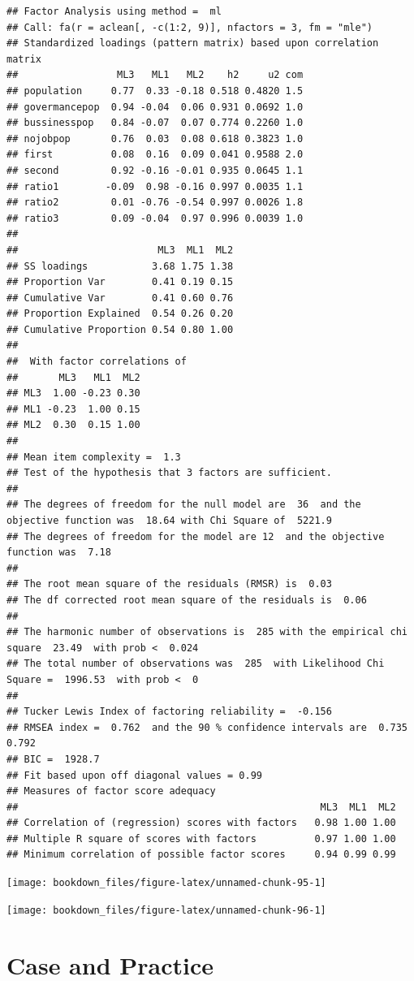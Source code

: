 \documentclass[]{ctexbook}
\begin{document}
\begin{verbatim}
## Factor Analysis using method =  ml
## Call: fa(r = aclean[, -c(1:2, 9)], nfactors = 3, fm = "mle")
## Standardized loadings (pattern matrix) based upon correlation matrix
##                 ML3   ML1   ML2    h2     u2 com
## population     0.77  0.33 -0.18 0.518 0.4820 1.5
## govermancepop  0.94 -0.04  0.06 0.931 0.0692 1.0
## bussinesspop   0.84 -0.07  0.07 0.774 0.2260 1.0
## nojobpop       0.76  0.03  0.08 0.618 0.3823 1.0
## first          0.08  0.16  0.09 0.041 0.9588 2.0
## second         0.92 -0.16 -0.01 0.935 0.0645 1.1
## ratio1        -0.09  0.98 -0.16 0.997 0.0035 1.1
## ratio2         0.01 -0.76 -0.54 0.997 0.0026 1.8
## ratio3         0.09 -0.04  0.97 0.996 0.0039 1.0
## 
##                        ML3  ML1  ML2
## SS loadings           3.68 1.75 1.38
## Proportion Var        0.41 0.19 0.15
## Cumulative Var        0.41 0.60 0.76
## Proportion Explained  0.54 0.26 0.20
## Cumulative Proportion 0.54 0.80 1.00
## 
##  With factor correlations of 
##       ML3   ML1  ML2
## ML3  1.00 -0.23 0.30
## ML1 -0.23  1.00 0.15
## ML2  0.30  0.15 1.00
## 
## Mean item complexity =  1.3
## Test of the hypothesis that 3 factors are sufficient.
## 
## The degrees of freedom for the null model are  36  and the objective function was  18.64 with Chi Square of  5221.9
## The degrees of freedom for the model are 12  and the objective function was  7.18 
## 
## The root mean square of the residuals (RMSR) is  0.03 
## The df corrected root mean square of the residuals is  0.06 
## 
## The harmonic number of observations is  285 with the empirical chi square  23.49  with prob <  0.024 
## The total number of observations was  285  with Likelihood Chi Square =  1996.53  with prob <  0 
## 
## Tucker Lewis Index of factoring reliability =  -0.156
## RMSEA index =  0.762  and the 90 % confidence intervals are  0.735 0.792
## BIC =  1928.7
## Fit based upon off diagonal values = 0.99
## Measures of factor score adequacy             
##                                                    ML3  ML1  ML2
## Correlation of (regression) scores with factors   0.98 1.00 1.00
## Multiple R square of scores with factors          0.97 1.00 1.00
## Minimum correlation of possible factor scores     0.94 0.99 0.99
\end{verbatim}

\texttt{[image: bookdown\_files/figure-latex/unnamed-chunk-95-1]}

\texttt{[image: bookdown\_files/figure-latex/unnamed-chunk-96-1]}

\hypertarget{homework}{%
\chapter{Case and Practice}\label{homework}}
\end{document}
